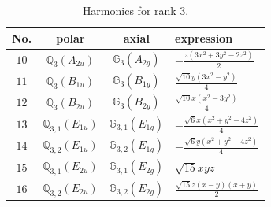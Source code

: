 \documentclass[fleqn,8pt,landscape]{jsarticle}
\begin{document}
\begin{table}[ht!]
\begin{center}
\caption{Harmonics for rank 3.}
\renewcommand{\arraystretch}{1.3}
\begin{tabular}{cccl} \hline \hline
No. & polar & axial & expression \\ \hline
$ 10 $ & $ \mathbb{Q}_{3}(A_{2u}) $ & $ \mathbb{G}_{3}(A_{2g}) $ & $ - \frac{z \left(3 x^{2} + 3 y^{2} - 2 z^{2}\right)}{2} $ \\
$ 11 $ & $ \mathbb{Q}_{3}(B_{1u}) $ & $ \mathbb{G}_{3}(B_{1g}) $ & $ \frac{\sqrt{10} y \left(3 x^{2} - y^{2}\right)}{4} $ \\
$ 12 $ & $ \mathbb{Q}_{3}(B_{2u}) $ & $ \mathbb{G}_{3}(B_{2g}) $ & $ \frac{\sqrt{10} x \left(x^{2} - 3 y^{2}\right)}{4} $ \\
$ 13 $ & $ \mathbb{Q}_{3,1}(E_{1u}) $ & $ \mathbb{G}_{3,1}(E_{1g}) $ & $ - \frac{\sqrt{6} x \left(x^{2} + y^{2} - 4 z^{2}\right)}{4} $ \\
$ 14 $ & $ \mathbb{Q}_{3,2}(E_{1u}) $ & $ \mathbb{G}_{3,2}(E_{1g}) $ & $ - \frac{\sqrt{6} y \left(x^{2} + y^{2} - 4 z^{2}\right)}{4} $ \\
$ 15 $ & $ \mathbb{Q}_{3,1}(E_{2u}) $ & $ \mathbb{G}_{3,1}(E_{2g}) $ & $ \sqrt{15} x y z $ \\
$ 16 $ & $ \mathbb{Q}_{3,2}(E_{2u}) $ & $ \mathbb{G}_{3,2}(E_{2g}) $ & $ \frac{\sqrt{15} z \left(x - y\right) \left(x + y\right)}{2} $ \\
 \hline \hline
\end{tabular}
\end{center}
\end{table}
\end{document}
